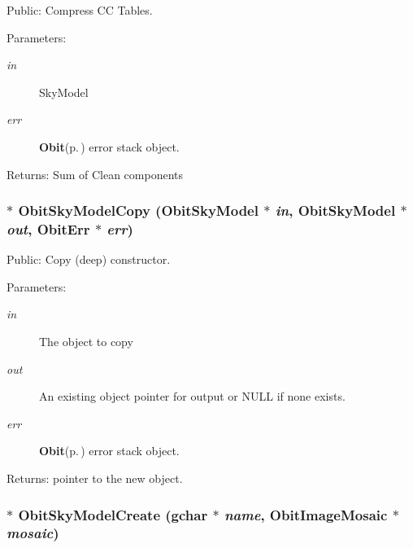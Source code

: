 Public: Compress CC Tables. 

\begin{Desc}
\item[Parameters:]
\begin{description}
\item[{\em in}]Sky\-Model \item[{\em err}]{\bf Obit}{\rm (p.\,\pageref{structObit})} error stack object. \end{description}
\end{Desc}
\begin{Desc}
\item[Returns:]Sum of Clean components \end{Desc}
\subsubsection{$\ast$ Obit\-Sky\-Model\-Copy ({\bf Obit\-Sky\-Model} $\ast$ {\em in}, {\bf Obit\-Sky\-Model} $\ast$ {\em out}, {\bf Obit\-Err} $\ast$ {\em err})}\label{ObitSkyModel_8c_a16}


Public: Copy (deep) constructor. 

\begin{Desc}
\item[Parameters:]
\begin{description}
\item[{\em in}]The object to copy \item[{\em out}]An existing object pointer for output or NULL if none exists. \item[{\em err}]{\bf Obit}{\rm (p.\,\pageref{structObit})} error stack object. \end{description}
\end{Desc}
\begin{Desc}
\item[Returns:]pointer to the new object. \end{Desc}
\subsubsection{$\ast$ Obit\-Sky\-Model\-Create (gchar $\ast$ {\em name}, {\bf Obit\-Image\-Mosaic} $\ast$ {\em mosaic})}\label{ObitSkyModel_8c_a18}


